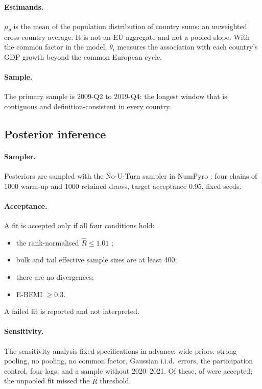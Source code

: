 \paragraph{Estimands.} $\mu_\theta$ is the mean of the population distribution of country
sums: an unweighted cross-country average. It is not an EU aggregate and not a pooled
slope. With the common factor in the model, $\theta_i$ measures the association with each
country's GDP growth beyond the common European cycle.

\paragraph{Sample.} The primary sample is 2009-Q2 to 2019-Q4: the longest window that is
contiguous and definition-consistent in every country.

\subsection{Posterior inference}

\paragraph{Sampler.} Posteriors are sampled with the No-U-Turn sampler
\citep{hoffman2014nuts} in NumPyro \citep{phan2019numpyro}: four chains of 1000 warm-up and
1000 retained draws, target acceptance $0.95$, fixed seeds.

\paragraph{Acceptance.} A fit is accepted only if all four conditions hold:
\begin{itemize}
  \item the rank-normalised $\widehat R\le 1.01$ \citep{vehtari2021rhat};
  \item bulk and tail effective sample sizes are at least 400;
  \item there are no divergences;
  \item E-BFMI $\ge 0.3$.
\end{itemize}
A failed fit is reported and not interpreted.

\paragraph{Sensitivity.} The sensitivity analysis fixed  specifications in
advance: wide priors, strong
pooling, no pooling, no common factor, Gaussian i.i.d.\ errors, the participation control,
four lags, and a sample without 2020--2021. Of these,  of
 were accepted; the unpooled fit missed the $\widehat R$ threshold.

